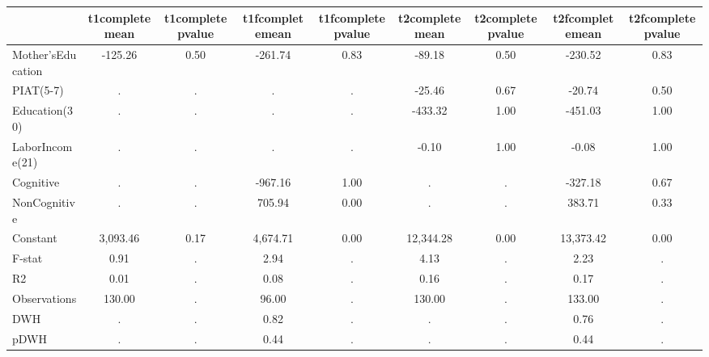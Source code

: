 \begin{table}[htbp]
\begin{tabular}{lcccccccc} \hline \hline
 & t1completemean  & t1completepvalue  & t1fcompletemean  & t1fcompletepvalue  & t2completemean  & t2completepvalue  & t2fcompletemean  & t2fcompletepvalue  \\  \hline 
Mother'sEducation &      -125.26 &         0.50 &      -261.74 &         0.83 &       -89.18 &         0.50 &      -230.52 &         0.83 \\  
PIAT(5-7) &            . &            . &            . &            . &       -25.46 &         0.67 &       -20.74 &         0.50 \\  
Education(30) &            . &            . &            . &            . &      -433.32 &         1.00 &      -451.03 &         1.00 \\  
LaborIncome(21) &            . &            . &            . &            . &        -0.10 &         1.00 &        -0.08 &         1.00 \\  
Cognitive &            . &            . &      -967.16 &         1.00 &            . &            . &      -327.18 &         0.67 \\  
NonCognitive &            . &            . &       705.94 &         0.00 &            . &            . &       383.71 &         0.33 \\  
Constant &     3,093.46 &         0.17 &     4,674.71 &         0.00 &    12,344.28 &         0.00 &    13,373.42 &         0.00 \\  
F-stat &         0.91 &            . &         2.94 &            . &         4.13 &            . &         2.23 &            . \\  
R2 &         0.01 &            . &         0.08 &            . &         0.16 &            . &         0.17 &            . \\  
Observations &       130.00 &            . &        96.00 &            . &       130.00 &            . &       133.00 &            . \\  
DWH &            . &            . &         0.82 &            . &            . &            . &         0.76 &            . \\  
pDWH &            . &            . &         0.44 &            . &            . &            . &         0.44 &            . \\  
\hline \hline \end{tabular}
\end{table}
